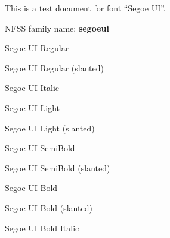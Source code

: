 \documentclass{jsarticle}
\begin{document}
{This is a test document for font ``Segoe UI''.}

NFSS family name: {\bfseries segoeui}

{\selectfont Segoe UI Regular}\par
{\selectfont Segoe UI Regular (slanted)}\par
{\selectfont Segoe UI Italic}\par
{\selectfont Segoe UI Light}\par
{\selectfont Segoe UI Light (slanted)}\par
{\selectfont Segoe UI SemiBold}\par
{\selectfont Segoe UI SemiBold (slanted)}\par
{\selectfont Segoe UI Bold}\par
{\selectfont Segoe UI Bold (slanted)}\par
{\selectfont Segoe UI Bold Italic}\par
\end{document}
